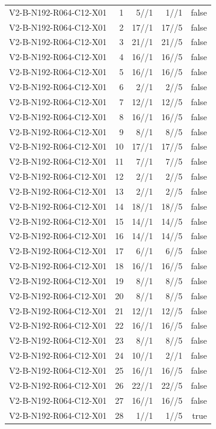 {\begin{longtable}{lrrrr}
V2-B-N192-R064-C12-X01 & 1 & 5//1 & 1//1 & false \\
V2-B-N192-R064-C12-X01 & 2 & 17//1 & 17//5 & false \\
V2-B-N192-R064-C12-X01 & 3 & 21//1 & 21//5 & false \\
V2-B-N192-R064-C12-X01 & 4 & 16//1 & 16//5 & false \\
V2-B-N192-R064-C12-X01 & 5 & 16//1 & 16//5 & false \\
V2-B-N192-R064-C12-X01 & 6 & 2//1 & 2//5 & false \\
V2-B-N192-R064-C12-X01 & 7 & 12//1 & 12//5 & false \\
V2-B-N192-R064-C12-X01 & 8 & 16//1 & 16//5 & false \\
V2-B-N192-R064-C12-X01 & 9 & 8//1 & 8//5 & false \\
V2-B-N192-R064-C12-X01 & 10 & 17//1 & 17//5 & false \\
V2-B-N192-R064-C12-X01 & 11 & 7//1 & 7//5 & false \\
V2-B-N192-R064-C12-X01 & 12 & 2//1 & 2//5 & false \\
V2-B-N192-R064-C12-X01 & 13 & 2//1 & 2//5 & false \\
V2-B-N192-R064-C12-X01 & 14 & 18//1 & 18//5 & false \\
V2-B-N192-R064-C12-X01 & 15 & 14//1 & 14//5 & false \\
V2-B-N192-R064-C12-X01 & 16 & 14//1 & 14//5 & false \\
V2-B-N192-R064-C12-X01 & 17 & 6//1 & 6//5 & false \\
V2-B-N192-R064-C12-X01 & 18 & 16//1 & 16//5 & false \\
V2-B-N192-R064-C12-X01 & 19 & 8//1 & 8//5 & false \\
V2-B-N192-R064-C12-X01 & 20 & 8//1 & 8//5 & false \\
V2-B-N192-R064-C12-X01 & 21 & 12//1 & 12//5 & false \\
V2-B-N192-R064-C12-X01 & 22 & 16//1 & 16//5 & false \\
V2-B-N192-R064-C12-X01 & 23 & 8//1 & 8//5 & false \\
V2-B-N192-R064-C12-X01 & 24 & 10//1 & 2//1 & false \\
V2-B-N192-R064-C12-X01 & 25 & 16//1 & 16//5 & false \\
V2-B-N192-R064-C12-X01 & 26 & 22//1 & 22//5 & false \\
V2-B-N192-R064-C12-X01 & 27 & 16//1 & 16//5 & false \\
V2-B-N192-R064-C12-X01 & 28 & 1//1 & 1//5 & true \\

\end{longtable}}
